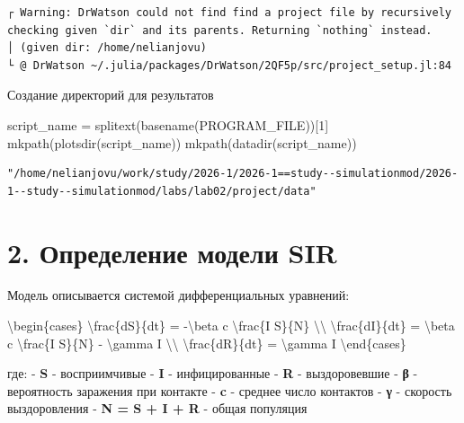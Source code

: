 \documentclass[
  12pt,
  a4paper,
  DIV=11,
  numbers=noendperiod]{scrreprt}
\newenvironment{Shaded}{\begin{snugshade}}{\end{snugshade}}
\newcommand{\ConstantTok}[1]{\textcolor[rgb]{0.56,0.35,0.01}{#1}}
\newcommand{\FloatTok}[1]{\textcolor[rgb]{0.68,0.00,0.00}{#1}}
\newcommand{\FunctionTok}[1]{\textcolor[rgb]{0.28,0.35,0.67}{#1}}
\newcommand{\NormalTok}[1]{\textcolor[rgb]{0.00,0.23,0.31}{#1}}
\newcommand{\OperatorTok}[1]{\textcolor[rgb]{0.37,0.37,0.37}{#1}}
\begin{document}
\begin{verbatim}
┌ Warning: DrWatson could not find find a project file by recursively checking given `dir` and its parents. Returning `nothing` instead.
│ (given dir: /home/nelianjovu)
└ @ DrWatson ~/.julia/packages/DrWatson/2QF5p/src/project_setup.jl:84
\end{verbatim}

Создание директорий для результатов

\begin{Shaded}
\begin{Highlighting}[]
\NormalTok{script\_name }\OperatorTok{=} \FunctionTok{splitext}\NormalTok{(}\FunctionTok{basename}\NormalTok{(}\ConstantTok{PROGRAM\_FILE}\NormalTok{))[}\FloatTok{1}\NormalTok{]}
\FunctionTok{mkpath}\NormalTok{(}\FunctionTok{plotsdir}\NormalTok{(script\_name))}
\FunctionTok{mkpath}\NormalTok{(}\FunctionTok{datadir}\NormalTok{(script\_name))}
\end{Highlighting}
\end{Shaded}

\begin{verbatim}
"/home/nelianjovu/work/study/2026-1/2026-1==study--simulationmod/2026-1--study--simulationmod/labs/lab02/project/data"
\end{verbatim}

\section{2. Определение модели
SIR}\label{ux43eux43fux440ux435ux434ux435ux43bux435ux43dux438ux435-ux43cux43eux434ux435ux43bux438-sir}

Модель описывается системой дифференциальных уравнений:

\begin{Shaded}
\begin{Highlighting}[]
\NormalTok{\textbackslash{}begin\{cases\}}
\NormalTok{\textbackslash{}frac\{dS\}\{dt\} = {-}\textbackslash{}beta c \textbackslash{}frac\{I S\}\{N\} \textbackslash{}\textbackslash{}}
\NormalTok{\textbackslash{}frac\{dI\}\{dt\} = \textbackslash{}beta c \textbackslash{}frac\{I S\}\{N\} {-} \textbackslash{}gamma I \textbackslash{}\textbackslash{}}
\NormalTok{\textbackslash{}frac\{dR\}\{dt\} = \textbackslash{}gamma I}
\NormalTok{\textbackslash{}end\{cases\}}
\end{Highlighting}
\end{Shaded}

где: - \textbf{S} - восприимчивые - \textbf{I} - инфицированные -
\textbf{R} - выздоровевшие - \textbf{β} - вероятность заражения при
контакте - \textbf{c} - среднее число контактов - \textbf{γ} - скорость
выздоровления - \textbf{N = S + I + R} - общая популяция
\end{document}
